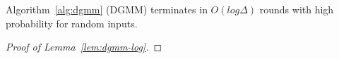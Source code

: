 \begin{lem}
\label{lem:dgmm-log}
Algorithm~\ref{alg:dgmm} (DGMM) terminates in $O(log \Delta)$ rounds with high probability for random inputs.
\end{lem}




\begin{proof}[Proof of Lemma~\ref{lem:dgmm-log}]
\end{proof}
 
